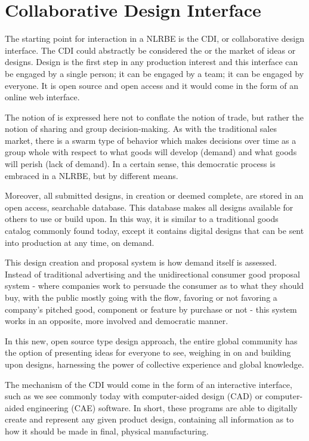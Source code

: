 \documentclass[10pt, a4paper, cleardoubleempty, openright, twoside]{book}
\begin{document}
\section {Collaborative Design Interface} 
The starting point for interaction in a NLRBE is the CDI, or
collaborative design interface. The CDI could abstractly be considered
the  or the market of ideas or designs. Design is
the first step in any production interest and this interface can be
engaged by a single person; it can be engaged by a team; it can be
engaged by everyone. It is open source and open access and it would come
in the form of an online web interface.

The notion of  is expressed here not to conflate the
notion of trade, but rather the notion of sharing and group
decision-making. As with the traditional sales market, there is a swarm
type of behavior which makes decisions over time as a group whole with
respect to what goods will develop (demand) and what goods will perish
(lack of demand). In a certain sense, this democratic process is
embraced in a NLRBE, but by different means.

Moreover, all submitted designs, in creation or deemed complete, are
stored in an open access, searchable database. This database makes all
designs available for others to use or build upon. In this way, it is
similar to a traditional goods catalog commonly found today, except it
contains digital designs that can be sent into production at any time,
on demand.

This design creation and proposal system is how demand itself is
assessed. Instead of traditional advertising and the unidirectional
consumer good proposal system - where companies work to persuade the
consumer as to what they should buy, with the public mostly going with
the flow, favoring or not favoring a company's pitched good, component
or feature by purchase or not - this system works in an opposite, more
involved and democratic manner.

In this new, open source type design approach, the entire global
community has the option of presenting ideas for everyone to see,
weighing in on and building upon designs, harnessing the power of
collective experience and global knowledge.

The mechanism of the CDI would come in the form of an interactive
interface, such as we see commonly today with computer-aided design
(CAD) or computer-aided engineering (CAE) software. In short, these
programs are able to digitally create and represent any given product
design, containing all information as to how it should be made in final,
physical manufacturing.
\end{document}
